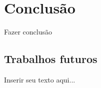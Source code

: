 %
%

\chapter{Conclusão}
\label{chap:conclusao}

Fazer conclusão

\section{Trabalhos futuros}
\label{sec:trabalhosFuturos}

Inserir seu texto aqui...
